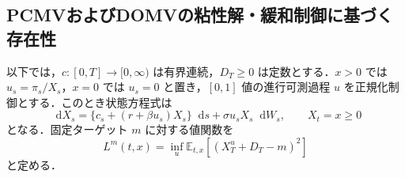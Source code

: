 \documentclass[10pt,a4paper]{article}
\theoremstyle{plain}
\theoremstyle{definition}
\newcommand{\E}{\mathbb{E}}
\newcommand{\dd}{\mathop{}\!\mathrm{d}}
\begin{document}
\subsection{PCMVおよびDOMVの粘性解・緩和制御に基づく存在性}
\label{app:pcmv-domv-existence}

以下では，$c:[0,T]\to[0,\infty)$ は有界連続，$D_T\geq0$ は定数とする．$x>0$ では $u_s=\pi_s/X_s$，$x=0$ では $u_s=0$ と置き，$[0,1]$ 値の進行可測過程 $u$ を正規化制御とする．このとき状態方程式は
\begin{equation}
 \dd X_s=\{c_s+(r+\beta u_s)X_s\}\dd s+\sigma u_sX_s\dd W_s,
 \qquad X_t=x\geq0
 \label{eq:normalized-controlled-state}
\end{equation}
となる．固定ターゲット $m$ に対する値関数を
\begin{equation}
 L^m(t,x)=\inf_{u}\E_{t,x}\!\left[(X_T^u+D_T-m)^2\right]
 \label{eq:app-weak-value}
\end{equation}
と定める．
\end{document}

